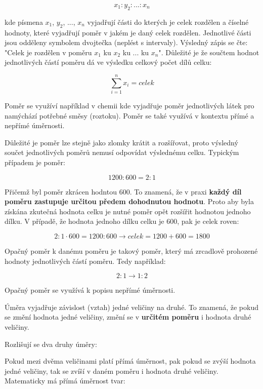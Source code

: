 $$ x_1:y_2:...:x_n $$

kde písmena  $x_1$, $y_2$, ..., $x_n$ vyjadřují části do kterých je celek rozdělen a číselné hodnoty, které vyjadřují poměr v jakém je daný celek rozdělen. Jednotlivé části jsou odděleny symbolem dvojtečka (neplést s intervaly). Výsledný zápis se čte: "Celek je rozdělen v poměru $x_1$ ku $x_2$ ku ... ku $x_n$". Důležité je že součtem hodnot jednotlivých částí poměru dá ve výsledku celkový počet dílů celku:

$$ \sum_{i=1}^{n} x_i = celek $$


Poměr se využíví například v chemii kde vyjadřuje poměr jednotlivých látek pro namýchází potřebné směsy (roztoku). Poměr se také využívá v kontextu přímé a nepřímé úměrnosti.


Důležité je poměr lze stejně jako zlomky krátit a rozšířovat, proto výsledný součet jednotlivých poměrů nemusí odpovídat výslednému celku. Typickým případem je poměr:

$$ 1200:600 = 2:1 $$

Přičemž byl poměr zkrácen hodntou 600. To znamená, že v praxi {\bf každý díl poměru zastupuje určitou předem dohodnutou hodnotu}. Proto aby byla získána zkutečná hodnota celku je nutné poměr opět rozšířit hodnotou jednoho dílku. V případě, že hodnota jednoho dílku celku je 600, pak je celek roven:

$$ 2:1 \cdot 600 = 1200:600 \rightarrow celek=1200+600=1800$$


Opačný poměr k danému poměru je takový poměr, který má zrcadlově prohozené hodnoty jednotlivých částí poměru. Tedy například:

$$ 2:1 \rightarrow 1:2 $$

Opačný poměr se využívá k popisu nepřímé úměrnosti.


Úměra vyjadřuje závislost (vztah) jedné veličiny na druhé. To znamená, že pokud se změní hodnota jedné veličiny, změní se v {\bf určitém poměru} i hodnota druhé veličiny.

Rozlišují se dva druhy úměry:

\vskip 4mm
\vskip 4mm


Pokud mezi dvěma veličinami platí přímá úměrnost, pak pokud se zvýší hodnota jedné veličiny, tak se zvíší v daném poměru i hodnota druhé veličiny. Matematicky má přímá úměrnost tvar:

